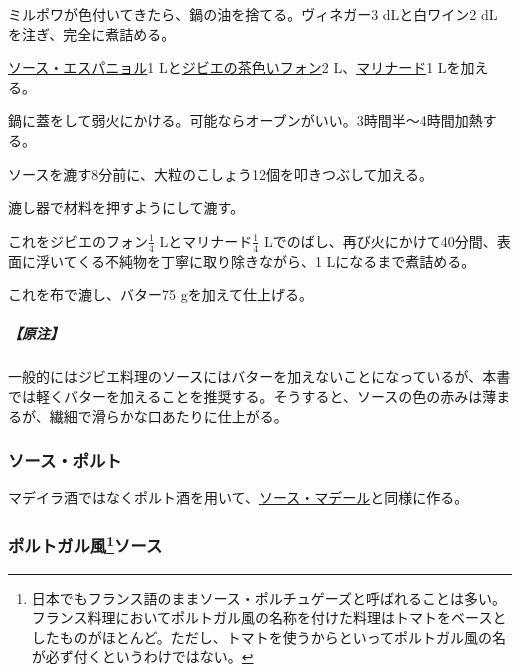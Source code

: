 \begin{recette}
ミルポワが色付いてきたら、鍋の油を捨てる。ヴィネガー3 dLと白ワイン2 dL
を注ぎ、完全に煮詰める。

\protect\hyperlink{sauce-espagnole}{ソース・エスパニョル}1
Lと\protect\hyperlink{fonds-de-gibier}{ジビエの茶色いフォン}2
L、\protect\hyperlink{marinades-et-saumures}{マリナード}1 Lを加える。

鍋に蓋をして弱火にかける。可能ならオーブンがいい。3時間半〜4時間加熱する。

ソースを漉す8分前に、大粒のこしょう12個を叩きつぶして加える。

漉し器で材料を押すようにして漉す。

これをジビエのフォン\(\frac{1}{4}\) Lとマリナード\(\frac{1}{4}\)
Lでのばし、再び火にかけて40分間、表面に浮いてくる不純物を丁寧に取り除きながら、1
Lになるまで煮詰める。

これを布で漉し、バター75 gを加えて仕上げる。

\hypertarget{nota-sauce-poivrade-pour-gibier}{%
\subparagraph{【原注】}\label{nota-sauce-poivrade-pour-gibier}}

一般的にはジビエ料理のソースにはバターを加えないことになっているが、本書では軽くバターを加えることを推奨する。そうすると、ソースの色の赤みは薄まるが、繊細で滑らかな口あたりに仕上がる。

\hypertarget{sauce-au-porto}{%
\subsubsection{ソース・ポルト}\label{sauce-au-porto}}



マデイラ酒ではなくポルト酒を用いて、\protect\hyperlink{sauce-madere}{ソース・マデール}と同様に作る。

\hypertarget{sauce-portugaise}{%
\subsubsection[ポルトガル風ソース]{\texorpdfstring{ポルトガル風\footnote{日本でもフランス語のままソース・ポルチュゲーズと呼ばれることは多い。フランス料理においてポルトガル風の名称を付けた料理はトマトをベースとしたものがほとんど。ただし、トマトを使うからといってポルトガル風の名が必ず付くというわけではない。}ソース}{ポルトガル風ソース}}\label{sauce-portugaise}}


\end{recette}
